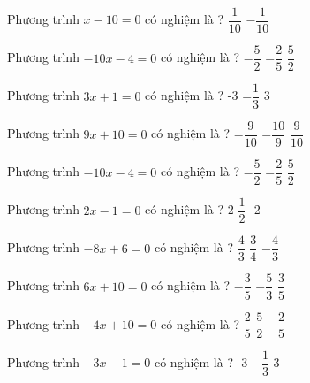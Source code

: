 \begin{ex} 
 Phương trình $x-10=0$ có nghiệm là ? 
 {$ \dfrac{ 1 }{ 10 } $} 
 {} 
 {$- \dfrac{ 1 }{ 10 } $}  
 \loigiai{} 
 \end{ex} 
 
\begin{ex} 
 Phương trình $-10x-4=0$ có nghiệm là ? 
 {$- \dfrac{ 5 }{ 2 } $} 
 {\True $- \dfrac{ 2 }{ 5 } $} 
 {$ \dfrac{ 5 }{ 2 } $}  
 \loigiai{} 
 \end{ex} 
 
\begin{ex} 
 Phương trình $3x+1=0$ có nghiệm là ? 
 {-3} 
 {\True $- \dfrac{ 1 }{ 3 } $} 
 {3}  
 \loigiai{} 
 \end{ex} 
 
\begin{ex} 
 Phương trình $9x+10=0$ có nghiệm là ? 
 {$- \dfrac{ 9 }{ 10 } $} 
 {\True $- \dfrac{ 10 }{ 9 } $} 
 {$ \dfrac{ 9 }{ 10 } $}  
 \loigiai{} 
 \end{ex} 
 
\begin{ex} 
 Phương trình $-10x-4=0$ có nghiệm là ? 
 {$- \dfrac{ 5 }{ 2 } $} 
 {\True $- \dfrac{ 2 }{ 5 } $} 
 {$ \dfrac{ 5 }{ 2 } $}  
 \loigiai{} 
 \end{ex} 
 
\begin{ex} 
 Phương trình $2x-1=0$ có nghiệm là ? 
 {2} 
 {\True $ \dfrac{ 1 }{ 2 } $} 
 {-2}  
 \loigiai{} 
 \end{ex} 
 
\begin{ex} 
 Phương trình $-8x+6=0$ có nghiệm là ? 
 {$ \dfrac{ 4 }{ 3 } $} 
 {\True $ \dfrac{ 3 }{ 4 } $} 
 {$- \dfrac{ 4 }{ 3 } $}  
 \loigiai{} 
 \end{ex} 
 
\begin{ex} 
 Phương trình $6x+10=0$ có nghiệm là ? 
 {$- \dfrac{ 3 }{ 5 } $} 
 {\True $- \dfrac{ 5 }{ 3 } $} 
 {$ \dfrac{ 3 }{ 5 } $}  
 \loigiai{} 
 \end{ex} 
 
\begin{ex} 
 Phương trình $-4x+10=0$ có nghiệm là ? 
 {$ \dfrac{ 2 }{ 5 } $} 
 {\True $ \dfrac{ 5 }{ 2 } $} 
 {$- \dfrac{ 2 }{ 5 } $}  
 \loigiai{} 
 \end{ex} 
 
\begin{ex} 
 Phương trình $-3x-1=0$ có nghiệm là ? 
 {-3} 
 {\True $- \dfrac{ 1 }{ 3 } $} 
 {3}  
 \loigiai{} 
 \end{ex} 
 
